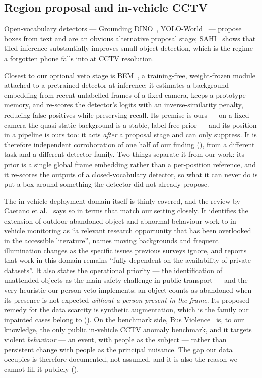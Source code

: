 \subsection{Region proposal and in-vehicle CCTV}
\label{sec:related:proposal}

Open-vocabulary detectors --- Grounding DINO~\cite{Liu_2023},
YOLO-World~\cite{Cheng_2024} --- propose boxes from text and are an obvious
alternative proposal stage; SAHI~\cite{Akyon_2022} shows that tiled inference
substantially improves small-object detection, which is the regime a forgotten
phone falls into at CCTV resolution.

Closest to our optional veto stage is BEM~\cite{Park_2026_bem}, a
training-free, weight-frozen module attached to a pretrained detector at
inference: it estimates a background embedding from recent unlabelled frames of
a fixed camera, keeps a prototype memory, and re-scores the detector's logits
with an inverse-similarity penalty, reducing false positives while preserving
recall. Its premise is ours --- on a fixed camera the quasi-static background is
a stable, label-free prior --- and its position in a pipeline is ours too: it
acts \emph{after} a proposal stage and can only suppress. It is therefore
independent corroboration of one half of our finding
(), from a different task and a different detector
family. Two things separate it from our work: its prior is a single global
frame embedding rather than a per-position reference, and it re-scores the
outputs of a closed-vocabulary detector, so what it can never do is put a box
around something the detector did not already propose.

The in-vehicle deployment domain itself is thinly covered, and the review by
Caetano et al.~\cite{Caetano_2022} says so in terms that match our setting
closely. It identifies the extension of outdoor abandoned-object and
abnormal-behaviour work to in-vehicle monitoring as ``a relevant research
opportunity that has been overlooked in the accessible literature'', names
moving backgrounds and frequent illumination changes as the specific issues
previous surveys ignore, and reports that work in this domain remains ``fully
dependent on the availability of private datasets''. It also states the
operational priority --- the identification of unattended objects as the main
safety challenge in public transport --- and the very heuristic our person veto
implements: an object counts as abandoned when its presence is not expected
\emph{without a person present in the frame}. Its proposed remedy for the data
scarcity is synthetic augmentation, which is the family our inpainted cases
belong to (). On the benchmark side, Bus
Violence~\cite{Ciampi_2022} is, to our knowledge, the only public in-vehicle
CCTV anomaly benchmark, and it targets violent \emph{behaviour} --- an event,
with people as the subject --- rather than persistent change with people as the
principal nuisance. The gap our data occupies is therefore documented, not
assumed, and it is also the reason we cannot fill it publicly
().
